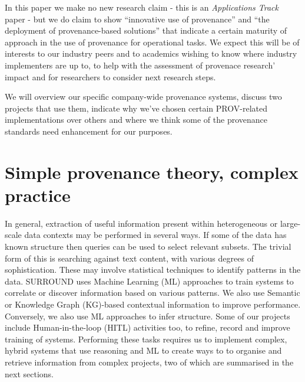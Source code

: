 \documentclass[letterpaper,twocolumn,10pt]{article}
\begin{document}
In this paper we make no new research claim - this is an \textit{Applications Track} paper - but we do claim 
to show ``innovative use of provenance'' and ``the deployment of provenance-based solutions'' that indicate
a certain maturity of approach in the use of provenance for operational tasks. We expect this will be of 
interests to our industry peers and to academics wishing to know where industry implementers are up to, to
help with the assessment of provenace research' impact and for researchers to consider next research steps.

We will overview our specific company-wide provenance systems, discuss two projects that use them, indicate 
why we've chosen certain PROV-related implementations over others and where we think some of the provenance
standards need enhancement for our purposes.


\section{Simple provenance theory, complex practice}
In general, extraction of useful information present within heterogeneous or large-scale data contexts may be performed in several 
ways. If some of the data has known structure then queries can be used to select relevant subsets. The trivial form 
of this is searching against text content, with various degrees of sophistication. These may involve statistical 
techniques to identify patterns in the data. SURROUND uses Machine Learning (ML) approaches to train systems to correlate or 
discover information based on various patterns. We also use Semantic or Knowledge Graph (KG)-based contextual information to 
improve performance. Conversely, we also use ML approaches to infer structure. Some of our projects
include Human-in-the-loop (HITL) activities too, to refine, record and improve training of systems. Performing these tasks 
requires us to implement complex, hybrid systems that use reasoning and ML to create ways to to organise and retrieve 
information from complex projects, two of which are summarised in the next sections.  

\end{document}

